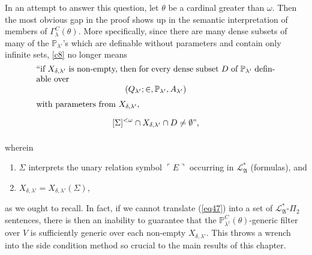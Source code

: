 \documentclass[12pt, twoside]{memoir}
\numberwithin{equation}{section}
\theoremstyle{definition}
\theoremstyle{remark}
\theoremstyle{definition}
\theoremstyle{definition}
\theoremstyle{definition}
\theoremstyle{remark}
\begin{document}
In an attempt to answer this question, let $\theta$ be a cardinal greater than $\omega$. Then the most obvious gap in the proof shows up in the semantic interpretation of members of $\Gamma^C_{\lambda}(\theta)$. More specifically, since there are many dense subsets of many of the $\mathbb{P}_{\lambda'}$'s which are definable without parameters and contain only infinite sets, \ref{c8} no longer means
\begin{equation}
    \label{eq47}
    \parbox{\dimexpr\linewidth-6em}{
        ``if $X_{\delta, \lambda'}$ is non-empty, then for every dense subset $D$ of $\mathbb{P}_{\lambda'}$ definable over $$(Q_{\lambda'}; \in, \mathbb{P}_{\lambda'}, A_{\lambda'})$$ with parameters from $X_{\delta, \lambda'}$, $$[\Sigma]^{< \omega} \cap X_{\delta, \lambda'} \cap D \neq \emptyset \text{'',}$$ 
    }
\end{equation}
wherein 
\begin{enumerate}[label=(\alph*)]
    \item $\Sigma$ interprets the unary relation symbol $\ulcorner E \urcorner$ occurring in $\mathcal{L}^*_{\mathfrak{A}}$ (formulas), and
    \item $X_{\delta, \lambda'} = X_{\delta, \lambda'}(\Sigma)$,
\end{enumerate}
as we ought to recall. In fact, if we cannot translate (\ref{eq47}) into a set of $\mathcal{L}^*_{\mathfrak{A}}$-$\Pi_2$ sentences, there is then an inability to guarantee that the $\mathbb{P}^C_{\lambda^{\dagger}}(\theta)$-generic filter over $V$ is sufficiently generic over each non-empty $X_{\delta, \lambda'}$. This throws a wrench into the side condition method so crucial to the main results of this chapter. 
\end{document}
